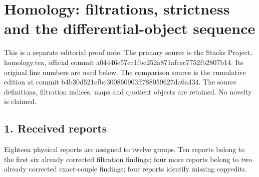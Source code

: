 \section{Homology: filtrations, strictness and the differential-object sequence}\label{note-05-homology-filtrations-strictness-and-the-differential-object-sequence}

This is a separate editorial proof note. The primary source is the Stacks Project, homology.tex, official commit a04446e5\allowbreak{}7ec1fbc2\allowbreak{}52a871af\allowbreak{}cec7752f\allowbreak{}b2807b14. Its original line numbers are used below. The comparison source is the cumulative edition at commit b4b30d52\allowbreak{}1cfbe300\allowbreak{}860903ff\allowbreak{}78805962\allowbreak{}7da6a434. The source definitions, filtration indices, maps and quotient objects are retained. No novelty is claimed.

\subsection{1. Received reports}\label{note-05-received-reports}

Eighteen physical reports are assigned to twelve groups. Ten reports belong to the first six already corrected filtration findings; four more reports belong to two already corrected exact-couple findings; four reports identify missing copyedits.

